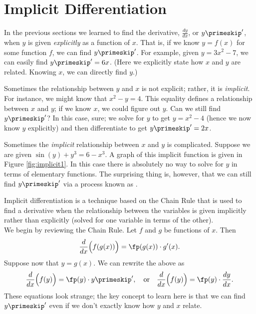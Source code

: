 \section{Implicit Differentiation}\label{sec:imp_deriv}

In the previous sections we learned to find the derivative, $ \frac{dy}{dx}$, or $y\primeskip'$, when $y$ is given \textit{explicitly} as a function of $x$. That is, if we know $y=f(x)$ for some function $f$, we can find $y\primeskip'$. For example, given  $y=3x^2-7$, we can easily find $y\primeskip'=6x$. (Here we explicitly state how $x$ and $y$ are related. Knowing $x$, we can directly find $y$.)

Sometimes the relationship between $y$ and $x$ is not explicit; rather, it is \textit{implicit}. For instance, we might know that $x^2-y=4$. This equality defines a relationship between $x$ and $y$; if we know $x$, we could figure out $y$. Can we still find $y\primeskip'$?  In this case, sure; we  solve for $y$ to get $y=x^2-4$ (hence we now know $y$ explicitly)  and then differentiate to get $y\primeskip'=2x$.

Sometimes the \textit{implicit} relationship between $x$ and $y$ is complicated.  Suppose we are given $\sin(y)+y^3=6-x^3$. A graph of this implicit function is given in Figure \ref{fig:implicit1}. In this case there is absolutely no way to solve for $y$ in terms of elementary functions.  The surprising thing is, however, that we can still find $y\primeskip'$ via a process known as .


Implicit differentiation is a technique based on the Chain Rule that is used to find a derivative when the relationship between the variables is given implicitly rather than explicitly (solved for one variable in terms of the other). \\

We begin by reviewing the Chain Rule. Let $f$ and $g$ be functions of $x$. Then $$\frac{d}{dx}\Big(f(g(x))\Big) = \fp(g(x))\cdot g'(x).$$ Suppose now that $y=g(x)$. We can rewrite the above as 
\begin{equation}\frac{d}{dx}\Big(f(y)\Big) = \fp(y)\cdot y\primeskip', \quad \text{or}\quad \frac{d}{dx}\Big(f(y)\Big)= \fp(y)\cdot \frac{dy}{dx} .\label{eq:implicit1}\end{equation} These equations look strange; the key concept to learn here is that we can find $y\primeskip'$ even if we don't exactly know how $y$ and $x$ relate.\\

